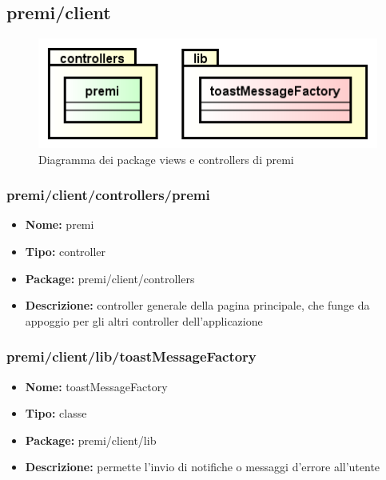 \subsection{premi/client}
\begin{figure}[H]
\begin{center}
\includegraphics[scale=0.45]{img/diapkg/client.png}
\caption{Diagramma dei package views e controllers di premi}
\end{center}
\end{figure}

\subsubsection{premi/client/controllers/premi}
\begin{itemize}
  \item[] \textbf{Nome:} premi
  \item[] \textbf{Tipo:} controller
  \item[] \textbf{Package:} premi/client/controllers
  \item[] \textbf{Descrizione:} controller generale della pagina principale, che funge da appoggio per gli altri controller dell'applicazione
\end{itemize}

\subsubsection{premi/client/lib/toastMessageFactory}
\begin{itemize}
  \item[] \textbf{Nome:} toastMessageFactory
  \item[] \textbf{Tipo:} classe
  \item[] \textbf{Package:} premi/client/lib
  \item[] \textbf{Descrizione:} permette l'invio di notifiche o messaggi d'errore all'utente
\end{itemize}






